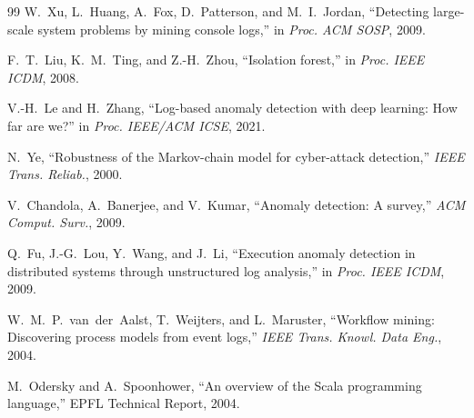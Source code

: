 \documentclass[11pt]{article}
\begin{document}
\begin{thebibliography}{99}
W.~Xu, L.~Huang, A.~Fox, D.~Patterson, and M.~I.~Jordan,
``Detecting large-scale system problems by mining console logs,''
in \emph{Proc. ACM SOSP}, 2009.

F.~T.~Liu, K.~M.~Ting, and Z.-H.~Zhou,
``Isolation forest,''
in \emph{Proc. IEEE ICDM}, 2008.

V.-H.~Le and H.~Zhang,
``Log-based anomaly detection with deep learning: How far are we?''
in \emph{Proc. IEEE/ACM ICSE}, 2021.

N.~Ye,
``Robustness of the Markov-chain model for cyber-attack detection,''
\emph{IEEE Trans. Reliab.}, 2000.

V.~Chandola, A.~Banerjee, and V.~Kumar,
``Anomaly detection: A survey,''
\emph{ACM Comput. Surv.}, 2009.

Q.~Fu, J.-G.~Lou, Y.~Wang, and J.~Li,
``Execution anomaly detection in distributed systems through unstructured log analysis,''
in \emph{Proc. IEEE ICDM}, 2009.

W.~M.~P.~van~der~Aalst, T.~Weijters, and L.~Maruster,
``Workflow mining: Discovering process models from event logs,''
\emph{IEEE Trans. Knowl. Data Eng.}, 2004.

M.~Odersky and A.~Spoonhower,
``An overview of the Scala programming language,''
EPFL Technical Report, 2004.

\end{thebibliography}
\end{document}
